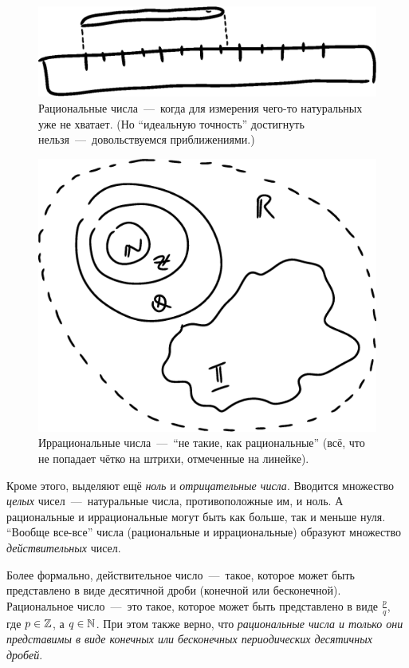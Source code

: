 \documentclass[a4paper,12pt]{article}
\begin{document}
  \begin{figure}[ht]
    \centering
    \includegraphics[width=0.6\linewidth]{images/Length}
    
    \caption{
      Рациональные числа~---~когда для измерения чего-то натуральных уже не хватает.
      (Но ``идеальную точность'' достигнуть нельзя~---~довольствуемся приближениями.)
    }
    \label{fig:rationals}
  \end{figure}
  
  \begin{figure}[ht]
    \centering
    \includegraphics[width=0.6\linewidth]{images/Numbers}
    
    \caption{
      Иррациональные числа~---~``не такие, как рациональные'' (всё, что не попадает чётко на штрихи, отмеченные на линейке).
    }
    \label{fig:irrationals}
  \end{figure}
  
  Кроме этого, выделяют ещё \emph{ноль} и \emph{отрицательные числа}.
  Вводится множество \emph{целых} чисел~---~натуральные числа, противоположные им, и ноль.
  А рациональные и иррациональные могут быть как больше, так и меньше нуля.
  ``Вообще все-все'' числа (рациональные и иррациональные) образуют множество \emph{действительных} чисел.
  
  Более формально, действительное число~---~такое, которое может быть представлено в виде десятичной дроби (конечной или бесконечной).
  Рациональное число~---~это такое, которое может быть представлено в виде $\frac{p}{q}$, где $p \hm\in \ZZ$, а $q \hm\in \NN$.
  При этом также верно, что \emph{рациональные числа и только они представимы в виде конечных или бесконечных периодических десятичных дробей}.
  
\end{document}
